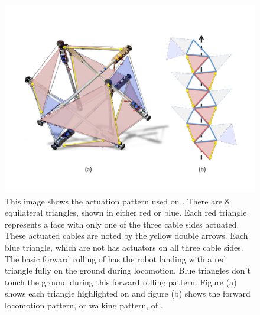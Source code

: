 \begin{figure}[thbp]
    \centering
    \includegraphics[width=0.6\linewidth]{tex/img/SB_RedvBlue_with_Walk}
    \caption{This image shows the actuation pattern used on \SB{}. There are 8 equilateral triangles, shown in either red or blue. Each red triangle represents a face with only one of the three cable sides actuated. These actuated cables are noted by the yellow double arrows. Each blue triangle, which are not  has actuators on all three cable sides. The basic forward rolling of \SB{} has the robot landing with a red triangle fully on the ground during locomotion. Blue triangles don't touch the ground during this forward rolling pattern. Figure (a) shows each triangle highlighted on \SB{} and figure (b) shows the forward locomotion pattern, or walking pattern, of \SB{}.}
    \label{fig:actuator_pattern}
\end{figure}






